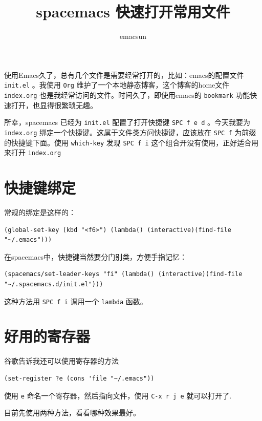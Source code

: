 \documentclass[10pt,a4paper,UTF8]{article}
\author{emacsun}
\date{}
\title{spacemacs 快速打开常用文件}
\begin{document}
\maketitle
\tableofcontents
{}
使用Emacs久了，总有几个文件是需要经常打开的，比如：emacs的配置文件 \texttt{init.el} 。我使用 \texttt{Org} 维护了一个本地静态博客，这个博客的home文件 \texttt{index.org} 也是我经常访问的文件。时间久了，即使用emacs的 \texttt{bookmark} 功能快速打开，也显得很繁琐无趣。

所幸，spacemacs 已经为 \texttt{init.el} 配置了打开快捷键 \texttt{SPC f e d} 。今天我要为 \texttt{index.org} 绑定一个快捷键。这属于文件类方问快捷键，应该放在 \texttt{SPC f} 为前缀的快捷键下面。使用 \texttt{which-key} 发现 \texttt{SPC f i} 这个组合开没有使用，正好适合用来打开 \texttt{index.org}


\section{快捷键绑定}
\label{sec:org55dce71}


常规的绑定是这样的：
\lstset{language=Lisp,label= ,caption= ,captionpos=b,numbers=none}
\begin{lstlisting}
(global-set-key (kbd "<f6>") (lambda() (interactive)(find-file "~/.emacs")))
\end{lstlisting}
在spacemacs中，快捷键当然要分门别类，方便手指记忆：
\lstset{language=Lisp,label= ,caption= ,captionpos=b,numbers=none}
\begin{lstlisting}
(spacemacs/set-leader-keys "fi" (lambda() (interactive)(find-file "~/.spacemacs.d/init.el")))
\end{lstlisting}

这种方法用 \texttt{SPC f i} 调用一个 \texttt{lambda} 函数。
\section{好用的寄存器}
\label{sec:org371b465}


谷歌告诉我还可以使用寄存器的方法

\lstset{language=Lisp,label= ,caption= ,captionpos=b,numbers=none}
\begin{lstlisting}
(set-register ?e (cons 'file "~/.emacs"))
\end{lstlisting}

使用 \texttt{e} 命名一个寄存器，然后指向文件，使用 \texttt{C-x r j e} 就可以打开了.

目前先使用两种方法，看看哪种效果最好。
\end{document}
